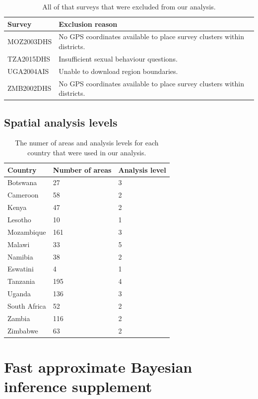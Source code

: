 \documentclass[a4paper, nobind]{templates/ociamthesis}
\begin{document}
\begin{table}[h]
\centering
\begin{tabularx}{\textwidth}{lX}
\toprule
Survey & Exclusion reason \\ 
 \midrule
MOZ2003DHS & No GPS coordinates available to place survey clusters within districts. \\
TZA2015DHS & Insufficient sexual behaviour questions. \\
UGA2004AIS & Unable to download region boundaries. \\
ZMB2002DHS & No GPS coordinates available to place survey clusters within districts. \\
\bottomrule
\end{tabularx}
\label{tab:surveys-excluded}
\caption{All of that surveys that were excluded from our analysis.}
\end{table}

\hypertarget{spatial-analysis-levels}{%
\section{Spatial analysis levels}\label{spatial-analysis-levels}}

\begin{table}[h]
\centering
\begin{tabularx}{\textwidth}{lXX}
\toprule
Country & Number of areas & Analysis level \\ 
\midrule
Botswana & 27 & 3 \\ 
Cameroon & 58 & 2 \\ 
Kenya & 47 & 2 \\ 
Lesotho & 10 & 1 \\ 
Mozambique & 161 & 3 \\ 
Malawi & 33 & 5 \\ 
Namibia & 38 & 2 \\ 
Eswatini & 4 & 1 \\ 
Tanzania & 195 & 4 \\ 
Uganda & 136 & 3 \\ 
South Africa & 52 & 2 \\ 
Zambia & 116 & 2 \\ 
Zimbabwe & 63 & 2 \\ 
\bottomrule
\end{tabularx}
\label{tab:area-levels}
\caption{The numer of areas and analysis levels for each country that were used in our analysis.}
\end{table}

\hypertarget{fast-approximate-bayesian-inference-supplement}{%
\chapter{Fast approximate Bayesian inference supplement}\label{fast-approximate-bayesian-inference-supplement}}
\end{document}
